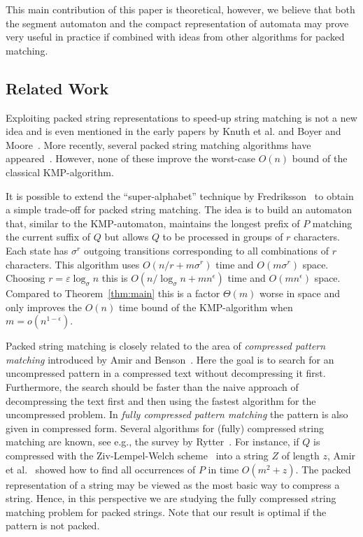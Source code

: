\documentclass{article}
\begin{document}
This main contribution of this paper is theoretical, however, we
believe that both the segment automaton and the compact representation
of automata may prove very useful in practice if combined with ideas
from other algorithms for packed matching.


\subsection{Related Work}
Exploiting packed string representations to speed-up string matching
is not a new idea and is even mentioned in the early papers by Knuth
et al. and Boyer and Moore~\cite{KMP1977, BM1977}. More recently,
several packed string matching algorithms have
appeared~\cite{BaezaYates1989b, TP1997,
  Fredriksson2002,Fredriksson2003, KBN2007,FL2009, FL2009a}. However,
none of these improve the worst-case $O(n)$ bound of the classical
KMP-algorithm.

It is possible to extend the ``super-alphabet'' technique by
Fredriksson~\cite{Fredriksson2002, Fredriksson2003} to obtain a simple
trade-off for packed string matching. The idea is to build an
automaton that, similar to the KMP-automaton, maintains the longest
prefix of $P$ matching the current suffix of $Q$ but allows $Q$ to be
processed in groups of $r$ characters. Each state has $\sigma^r$
outgoing transitions corresponding to all combinations of $r$
characters. This algorithm uses $O(n/r + m\sigma^r)$ time and
$O(m\sigma^r)$ space. Choosing $r = \varepsilon \log_{\sigma} n$ this
is $O(n/\log_\sigma n + mn^{\epsilon})$ time and $O(mn^{\epsilon})$
space. Compared to Theorem~\ref{thm:main} this is a factor $\Theta(m)$
worse in space and only improves the $O(n)$ time bound of the
KMP-algorithm when $m = o(n^{1-\epsilon})$.



Packed string matching is closely related to the area of
\emph{compressed pattern matching} introduced by Amir and
Benson~\cite{AB1992,AB1992a}. Here the goal is to search for an
uncompressed pattern in a compressed text without decompressing it
first. Furthermore, the search should be faster than the naive
approach of decompressing the text first and then using the fastest
algorithm for the uncompressed problem. In \emph{fully compressed
  pattern matching} the pattern is also given in compressed form.
Several algorithms for (fully) compressed string matching are known,
see e.g., the survey by Rytter~\cite{Rytter1999}. For instance, if $Q$
is compressed with the Ziv-Lempel-Welch scheme~\cite{Welch1984} into a
string $Z$ of length $z$, Amir et al.~\cite{ABF1996} showed how to
find all occurrences of $P$ in time $O(m^2 + z)$. The packed
representation of a string may be viewed as the most basic way to
compress a string. Hence, in this perspective we are studying the
fully compressed string matching problem for packed strings. Note that
our result is optimal if the pattern is not packed.
\end{document}
